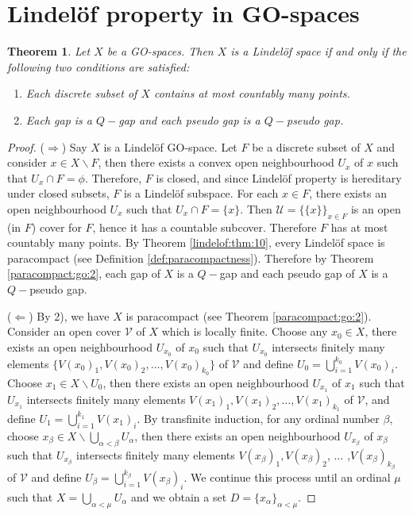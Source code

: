 \documentclass[12pt,oneside,english]{amsbook}
\numberwithin{equation}{section} %
\numberwithin{figure}{section} %
\theoremstyle{plain}
\numberwithin{section}{chapter}
\newtheorem{thm}{Theorem}[section]
\theoremstyle{plain}
\begin{document}
\section{ Lindel\"{o}f property in GO-spaces}
\begin{thm}\label{lindelof:thm:13}
  Let $X$ be a GO-spaces. Then $X$ is a  Lindel\"{o}f space if and only if the following two conditions are satisfied:
  \begin{enumerate}
  \item Each discrete subset of $X$ contains at most countably many points.
  \item Each gap is a $Q-$gap and each pseudo gap is a $Q-$pseudo gap.
  \end{enumerate}
\end{thm}
\begin{proof}
  ($\Rightarrow$) Say $X$ is a  Lindel\"{o}f GO-space. Let $F$ be a discrete subset of $X$ and consider $x \in X \backslash F$, then there exists a convex open neighbourhood $U_x$ of $x$ such that $U_x \cap F = \phi$. Therefore, $F$ is closed, and since Lindel\"{o}f property is hereditary under closed subsets, $F$ is a Lindel\"{o}f subspace. For each $x \in F$, there exists an open neighbourhood $U_x$ such that $U_x \cap F = \{x\}$. Then $\mathcal{U} = \{\{x\}\}_{x \in F}$ is an open (in $F$) cover for $F$, hence it has a countable subcover. Therefore $F$ has at most countably many points.
  By Theorem \ref{lindelof:thm:10}, every Lindel\"{o}f space is paracompact (see Definition \ref{def:paracompactness}). Therefore by Theorem \ref{paracompact:go:2}, each gap of $X$ is a $Q-$gap and each pseudo gap of $X$ is a $Q-$pseudo gap.


  ($\Leftarrow$) By 2), we have $X$ is paracompact (see Theorem \ref{paracompact:go:2}). Consider an open cover $\mathcal{V}$ of $X$ which is locally finite. Choose any $x_0 \in X$, there exists an open neighbourhood $U_{x_0}$ of $x_0$ such that $U_{x_0}$ intersects finitely many elements $\{V(x_0)_{1},V(x_0)_{2}, \ldots , V(x_0)_{k_0} \}$ of $\mathcal{V}$ and define $U_{0} = \bigcup_{i = 1}^{k_0}V(x_0)_{i}$. Choose $x_1 \in X \backslash U_0$, then there exists an open neighbourhood $U_{x_1}$ of $x_1$ such that $U_{x_1}$ intersects finitely many elements  $V(x_1)_{1},V(x_1)_{2}, \ldots , V(x_1)_{k_1}$ of $\mathcal{V}$, and define $U_1 = \bigcup_{i = 1}^{k_1}V(x_1)_{i}$. By transfinite induction, for any ordinal number $\beta$, choose $x_{\beta} \in X \backslash \bigcup_{\alpha < \beta}U_{\alpha}$, then there exists an open neighbourhood $U_{x_{\beta}}$ of $x_{\beta}$ such that $U_{x_{\beta}}$ intersects finitely many elements $V(x_{\beta})_{1},V(x_{\beta})_{2}$, $\ldots$ ,$V(x_{\beta})_{k_{\beta}}$ of $\mathcal{V}$ and define $U_{\beta} = \bigcup_{i = 1}^{k_{\beta}}V(x_{\beta})_{i}$. We continue this process until an ordinal $\mu$ such that $X = \bigcup_{\alpha < \mu}U_{\alpha}$ and we obtain a set $D = \{x_{\alpha}\}_{\alpha < \mu}$.
 

\end{proof}
\end{document}
